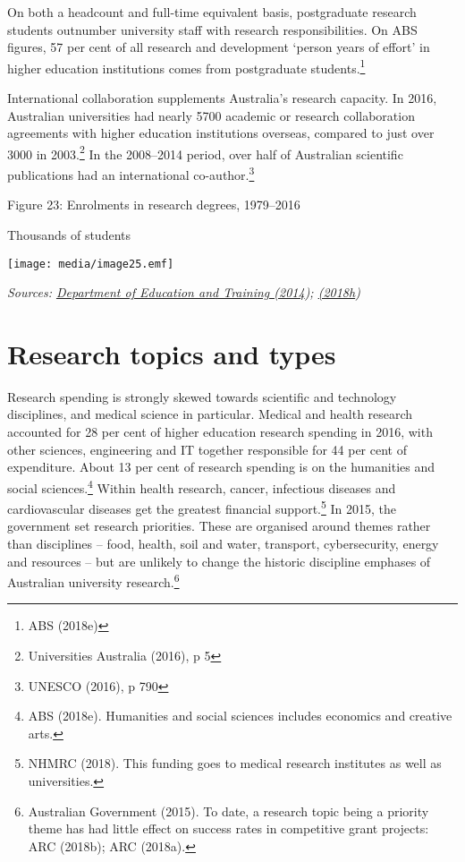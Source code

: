 \documentclass[]{book}
\begin{document}
On both a headcount and full-time equivalent basis, postgraduate research students outnumber university staff with research responsibilities. On ABS figures, 57 per cent of all research and development `person years of effort' in higher education institutions comes from postgraduate students.\footnote{ABS (2018e)}

International collaboration supplements Australia's research capacity. In 2016, Australian universities had nearly 5700 academic or research collaboration agreements with higher education institutions overseas, compared to just over 3000 in 2003.\footnote{Universities Australia (2016), p 5} In the 2008--2014 period, over half of Australian scientific publications had an international co-author.\footnote{UNESCO (2016), p 790}

\protect\hypertarget{_Toc523322083}{}{}Figure 23: Enrolments in research degrees, 1979--2016

Thousands of students

\texttt{[image: media/image25.emf]}

\emph{Sources: \protect\hyperlink{_ENREF_60}{Department of Education and Training (2014}); \protect\hyperlink{_ENREF_87}{(2018h})}

\hypertarget{research-topics-and-types}{%
\section{Research topics and types}\label{research-topics-and-types}}

Research spending is strongly skewed towards scientific and technology disciplines, and medical science in particular. Medical and health research accounted for 28 per cent of higher education research spending in 2016, with other sciences, engineering and IT together responsible for 44 per cent of expenditure. About 13 per cent of research spending is on the humanities and social sciences.\footnote{ABS (2018e). Humanities and social sciences includes economics and creative arts.} Within health research, cancer, infectious diseases and cardiovascular diseases get the greatest financial support.\footnote{NHMRC (2018). This funding goes to medical research institutes as well as universities.} In 2015, the government set research priorities. These are organised around themes rather than disciplines -- food, health, soil and water, transport, cybersecurity, energy and resources -- but are unlikely to change the historic discipline emphases of Australian university research.\footnote{Australian Government (2015). To date, a research topic being a priority theme has had little effect on success rates in competitive grant projects: ARC (2018b); ARC (2018a).}
\end{document}
